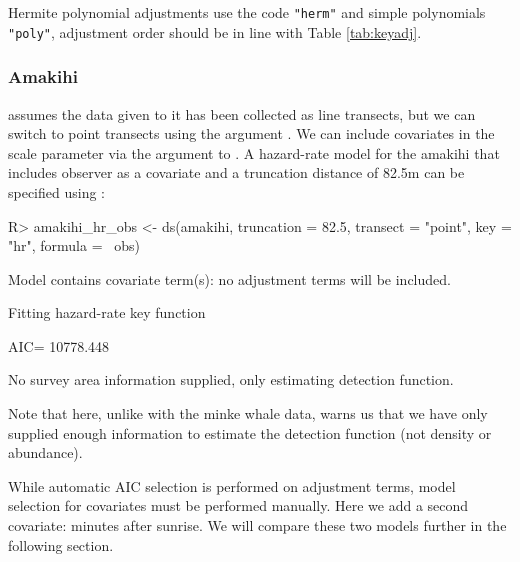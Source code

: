 \documentclass[article,shortnames]{jss}
\begin{document}
Hermite polynomial adjustments use the code \texttt{"herm"} and simple
polynomials \texttt{"poly"}, adjustment order should be in line with
Table \ref{tab:keyadj}.

\subsubsection{Amakihi}\label{amakihi-1}

 assumes the data given to it has been collected as line
transects, but we can switch to point transects using the argument
. We can include covariates in the scale
parameter via the  argument to . A
hazard-rate model for the amakihi that includes observer as a covariate
and a truncation distance of 82.5m \citep{Marques:2007ey} can be
specified using :

\begin{CodeChunk}
\begin{CodeInput}
R> amakihi_hr_obs <- ds(amakihi, truncation = 82.5, transect = "point",
                     key = "hr", formula = ~obs)
\end{CodeInput}
\begin{CodeOutput}
Model contains covariate term(s): no adjustment terms will be included.
\end{CodeOutput}
\begin{CodeOutput}
Fitting hazard-rate key function
\end{CodeOutput}
\begin{CodeOutput}
AIC= 10778.448
\end{CodeOutput}
\begin{CodeOutput}
No survey area information supplied, only estimating detection function.
\end{CodeOutput}
\end{CodeChunk}

Note that here, unlike with the minke whale data,  warns us
that we have only supplied enough information to estimate the detection
function (not density or abundance).

While automatic AIC selection is performed on adjustment terms, model
selection for covariates must be performed manually. Here we add a
second covariate: minutes after sunrise. We will compare these two
models further in the following section.
\end{document}
